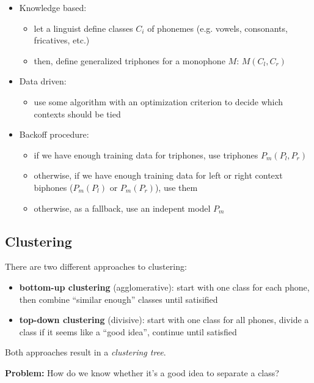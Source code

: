 \begin{itemize}
    \item Knowledge based:
        \begin{itemize}
            \item let a linguist define classes $C_i$ of phonemes (e.g. vowels, consonants, fricatives, etc.)
            \item then, define generalized triphones for a monophone $M$: $M(C_l, C_r)$
        \end{itemize}
    \item Data driven:
        \begin{itemize}
            \item use some algorithm with an optimization criterion to decide which contexts should be tied
        \end{itemize}
    \item Backoff procedure:
        \begin{itemize}
            \item if we have enough training data for triphones, use triphones $P_m(P_l, P_r)$
            \item otherwise, if we have enough training data for left or right context biphones ($P_m(P_l)$ or $P_m(P_r)$), use them
            \item otherwise, as a fallback, use an indepent model $P_m$
        \end{itemize}
\end{itemize}

\subsection{Clustering}

There are two different approaches to clustering:
\begin{itemize}
    \item \textbf{bottom-up clustering} (agglomerative): start with one class for each phone, then combine ``similar enough'' classes until satisified
    \item \textbf{top-down clustering} (divisive): start with one class for all phones, divide a class if it seems like a ``good idea'', continue until satisfied
\end{itemize}

Both approaches result in a \textit{clustering tree}.

\vspace{10pt}
\textbf{Problem:} How do we know whether it's a good idea to separate a class? 

